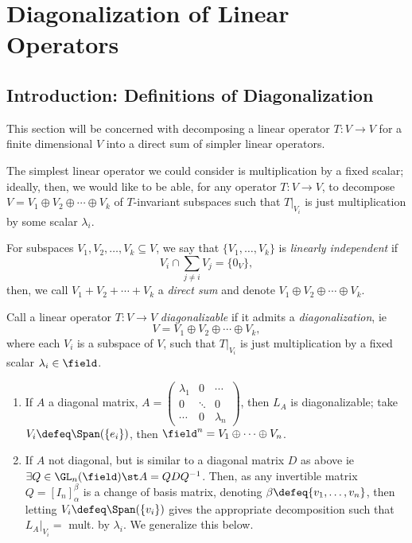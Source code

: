 \section{Diagonalization of Linear Operators}

\subsection{Introduction: Definitions of Diagonalization}

This section will be concerned with decomposing a linear operator $T : V \to V$ for a finite dimensional $V$ into a direct sum of simpler linear operators.

The simplest linear operator we could consider is multiplication by a fixed scalar; ideally, then, we would like to be able, for any operator $T : V \to V$, to decompose $V = V_1 \oplus V_2 \oplus \cdots \oplus V_k$ of $T$-invariant subspaces such that $T|_{V_{i}}$ is just multiplication by some scalar $\lambda_i$.


\begin{definition}
    For subspaces $V_1, V_2, \dots, V_k \subseteq V$, we say that $\{V_1, \dots, V_k\}$ is \emph{linearly independent} if $$V_i \cap \sum_{j \neq i} V_j = \{0_V\},$$ then, we call $V_1 + V_2 + \cdots + V_k$ a \emph{direct sum} and denote $V_1 \oplus V_2 \oplus \cdots \oplus V_k$.
\end{definition}

\begin{definition}[Diagonalization]
    Call a linear operator $T : V\to V$ \emph{diagonalizable} if it admits a \emph{diagonalization}, ie \[
    V = V_1 \oplus V_2 \oplus \cdots \oplus V_k,    
    \]
    where each $V_i$ is a subspace of $V$, such that $T\vert_{V_i}$ is just multiplication by a fixed scalar $\lambda_i \in \field$.
\end{definition}

\begin{example}
    \begin{enumerate}
        \item If $A$ a diagonal matrix, $A = \begin{pmatrix}
            \lambda_1 & 0 & \cdots\\
            0 & \ddots & 0\\
            \cdots & 0 & \lambda_n
        \end{pmatrix}$, then $L_A$ is diagonalizable; take $V_i \defeq \Span(\{e_i\})$, then $\field^n = V_1 \oplus \cdots \oplus V_n$.
        \item If $A$ not diagonal, but is similar to a diagonal matrix $D$ as above ie $\exists Q \in \GL_n(\field)\st A = Q D Q^{-1}$. Then, as any invertible matrix $Q = [I_n]_\alpha^\beta$ is a change of basis matrix, denoting $\beta \defeq \{v_1, \dots, v_n\}$, then letting $V_i \defeq \Span (\{v_i\})$ gives the appropriate decomposition such that $L_A \vert_{V_i} = $ mult. by $\lambda_i$. We generalize this below.
    \end{enumerate}
\end{example}

